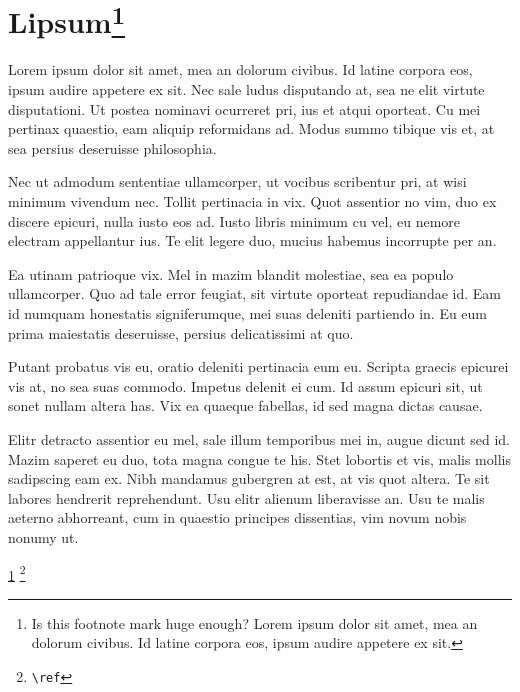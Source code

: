 \documentclass[twoside]{article}
\begin{document}
    \section[Lipsum]{Lipsum\footnote[99]{Is this footnote mark huge enough? 
    Lorem ipsum dolor sit amet, mea an dolorum civibus. Id latine corpora eos, ipsum audire appetere ex sit.}}
    \label{sec3}
    Lorem ipsum dolor sit amet, mea an dolorum civibus. Id latine corpora eos, ipsum audire appetere ex sit. 
    Nec sale ludus disputando at, sea ne elit virtute disputationi. Ut postea nominavi ocurreret pri, ius et atqui oporteat. 
    Cu mei pertinax quaestio, eam aliquip reformidans ad. Modus summo tibique vis et, at sea persius deseruisse philosophia.

    Nec ut admodum sententiae ullamcorper, ut vocibus scribentur pri, at wisi minimum vivendum nec. Tollit pertinacia in vix. 
    Quot assentior no vim, duo ex discere epicuri, nulla iusto eos ad. Iusto libris minimum cu vel, eu nemore electram appellantur ius. 
    Te elit legere duo, mucius habemus incorrupte per an.

    Ea utinam patrioque vix. Mel in mazim blandit molestiae, sea ea populo ullamcorper. Quo ad tale error feugiat, 
    sit virtute oporteat repudiandae id. Eam id numquam honestatis signiferumque, mei suas deleniti partiendo in. 
    Eu eum prima maiestatis deseruisse, persius delicatissimi at quo.

    Putant probatus vis eu, oratio deleniti pertinacia eum eu. Scripta graecis epicurei vis at, no sea suas commodo. 
    Impetus delenit ei cum. Id assum epicuri sit, ut sonet nullam altera has. Vix ea quaeque fabellas, id sed magna dictas causae.

    Elitr detracto assentior eu mel, sale illum temporibus mei in, augue dicunt sed id. Mazim saperet eu duo, 
    tota magna congue te his. Stet lobortis et vis, malis mollis sadipscing eam ex. Nibh mandamus gubergren at est, 
    at vis quot altera. Te sit labores hendrerit reprehendunt. Usu elitr alienum liberavisse an. Usu te malis aeterno 
    abhorreant, cum in quaestio principes dissentias, vim novum nobis nonumy ut.
    
    \ref{sec3}
    \footnote{\texttt{\textbackslash ref}}
\end{document}
